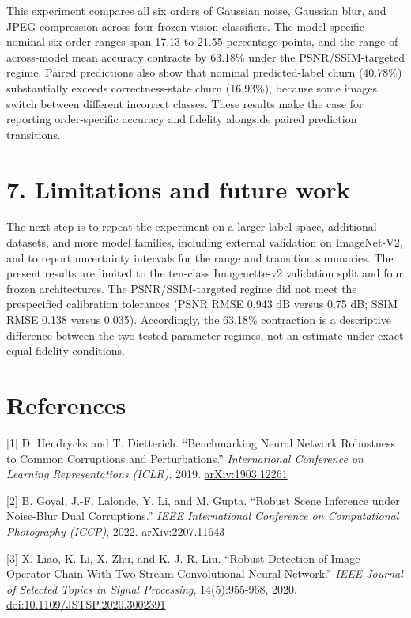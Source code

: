 \documentclass[10pt,twocolumn]{article}
\begin{document}
This experiment compares all six orders of Gaussian noise, Gaussian
blur, and JPEG compression across four frozen vision classifiers. The
model-specific nominal six-order ranges span 17.13 to 21.55 percentage
points, and the range of across-model mean accuracy contracts by 63.18\%
under the PSNR/SSIM-targeted regime. Paired predictions also show that
nominal predicted-label churn (40.78\%) substantially exceeds
correctness-state churn (16.93\%), because some images switch between
different incorrect classes. These results make the case for reporting
order-specific accuracy and fidelity alongside paired prediction
transitions.

\section{7. Limitations and future work}\label{limitations-and-future-work}

The next step is to repeat the experiment on a larger label space,
additional datasets, and more model families, including external
validation on ImageNet-V2, and to report uncertainty intervals for the
range and transition summaries. The present results are limited to the
ten-class Imagenette-v2 validation split and four frozen architectures.
The PSNR/SSIM-targeted regime did not meet the prespecified calibration
tolerances (PSNR RMSE 0.943 dB versus 0.75 dB; SSIM RMSE 0.138 versus
0.035). Accordingly, the 63.18\% contraction is a descriptive difference
between the two tested parameter regimes, not an estimate under exact
equal-fidelity conditions.

\section*{References}\label{references}

{[}1{]} D. Hendrycks and T. Dietterich. ``Benchmarking Neural Network
Robustness to Common Corruptions and Perturbations.''
\emph{International Conference on Learning Representations (ICLR)},
2019. \href{https://arxiv.org/abs/1903.12261}{arXiv:1903.12261}

{[}2{]} B. Goyal, J.-F. Lalonde, Y. Li, and M. Gupta. ``Robust Scene
Inference under Noise-Blur Dual Corruptions.'' \emph{IEEE International
Conference on Computational Photography (ICCP)}, 2022.
\href{https://arxiv.org/abs/2207.11643}{arXiv:2207.11643}

{[}3{]} X. Liao, K. Li, X. Zhu, and K. J. R. Liu. ``Robust Detection of
Image Operator Chain With Two-Stream Convolutional Neural Network.''
\emph{IEEE Journal of Selected Topics in Signal Processing},
14(5):955-968, 2020.
\href{https://doi.org/10.1109/JSTSP.2020.3002391}{doi:10.1109/JSTSP.2020.3002391}
\end{document}
